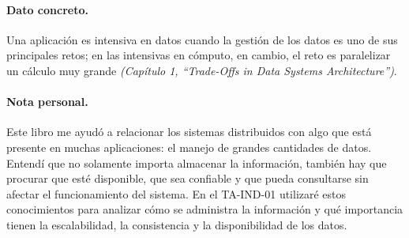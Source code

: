 \documentclass[12pt,a4paper]{article}
\begin{document}
\paragraph{Dato concreto.}
Una aplicación es intensiva en datos cuando la gestión de los datos es uno de sus principales retos; en las intensivas en cómputo, en cambio, el reto es paralelizar un cálculo muy grande \textit{(Capítulo 1, ``Trade-Offs in Data Systems Architecture'')}.

\paragraph{Nota personal.}
Este libro me ayudó a relacionar los sistemas distribuidos con algo que está presente en muchas aplicaciones: el manejo de grandes cantidades de datos. Entendí que no solamente importa almacenar la información, también hay que procurar que esté disponible, que sea confiable y que pueda consultarse sin afectar el funcionamiento del sistema. En el TA-IND-01 utilizaré estos conocimientos para analizar cómo se administra la información y qué importancia tienen la escalabilidad, la consistencia y la disponibilidad de los datos.

\clearpage

\nocite{abgaz2023,cerny2023,zhang2024,singh2022,kleppmann2026}
\printbibliography[title={Referencias}]
\end{document}
